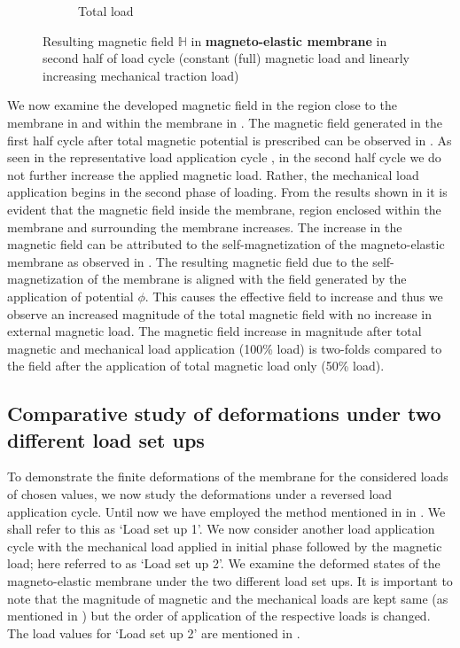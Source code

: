 \documentclass[11pt,a4paper,final]{article}
\begin{document}
\begin{figure}[h]
\begin{subfigure}{0.32\textwidth}
\caption{Total load}
\label{fig:3.14.3}
\end{subfigure}
\caption{Resulting magnetic field $\mathbb{H}$ in \textbf{magneto-elastic membrane} in second half of load cycle (constant (full) magnetic load and linearly increasing mechanical traction load)}
\label{fig:3.14}
\end{figure}

We now examine the developed magnetic field in the region close to the membrane in  and within the membrane in . The magnetic field generated in the first half cycle after total magnetic potential is prescribed can be observed in . As seen in the representative load application cycle , in the second half cycle we do not further increase the applied magnetic load. Rather, the mechanical load application begins in the second phase of loading. From the results shown in  it is evident that the magnetic field inside the membrane, region enclosed within the membrane and surrounding the membrane increases. The increase in the magnetic field can be attributed to the self-magnetization of the magneto-elastic membrane as observed in . The resulting magnetic field due to the self-magnetization of the membrane is aligned with the field generated by the application of potential $\phi$. This causes the effective field to increase and thus we observe an increased magnitude of the total magnetic field with no increase in external magnetic load. The magnetic field increase in magnitude after total magnetic and mechanical load application (100\% load) is two-folds compared to the field after the application of total magnetic load only (50\% load). \par 

\subsection{Comparative study of deformations under two different load set ups}

To demonstrate the finite deformations of the membrane for the considered loads of chosen values, we now study the deformations under a reversed load application cycle. Until now we have employed the method mentioned in  in . We shall refer to this as `Load set up 1'. We now consider another load application cycle with the mechanical load applied in initial phase followed by the magnetic load; here referred to as `Load set up 2'. We examine the deformed states of the magneto-elastic membrane under the two different load set ups. It is important to note that the magnitude of magnetic and the mechanical loads are kept same (as mentioned in ) but the order of application of the respective loads is changed. The load values for `Load set up 2' are mentioned in . \par 
\end{document}
